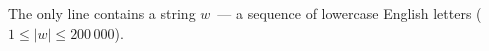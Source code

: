 The only line contains a string $w$~--- a sequence of lowercase English letters ($1 \le |w| \le 200\,000$).